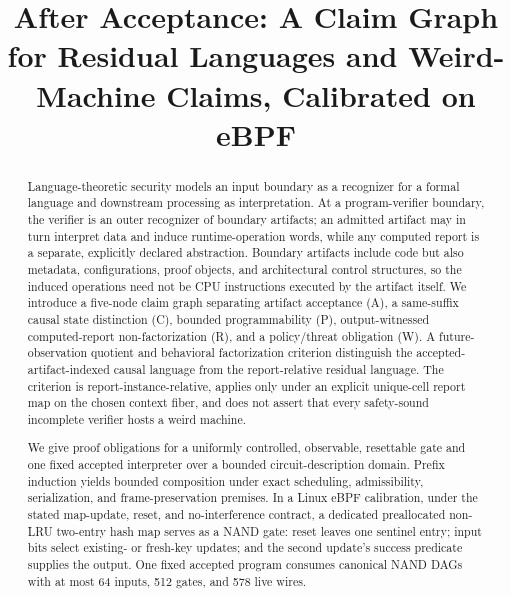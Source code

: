 \documentclass[conference]{IEEEtran}
\title{After Acceptance: A Claim Graph for Residual Languages and Weird-Machine Claims, Calibrated on eBPF}
\author{\IEEEauthorblockN{Chengao Zhang}
\IEEEauthorblockA{Independent Researcher\\emtanling@gmail.com}}
\begin{document}
\maketitle

\begin{abstract}
Language-theoretic security models an input boundary as a recognizer for a formal language and downstream processing as interpretation. At a program-verifier boundary, the verifier is an outer recognizer of boundary artifacts; an admitted artifact may in turn interpret data and induce runtime-operation words, while any computed report is a separate, explicitly declared abstraction. Boundary artifacts include code but also metadata, configurations, proof objects, and architectural control structures, so the induced operations need not be CPU instructions executed by the artifact itself. We introduce a five-node claim graph separating artifact acceptance (A), a same-suffix causal state distinction (C), bounded programmability (P), output-witnessed computed-report non-factorization (R), and a policy/threat obligation (W). A future-observation quotient and behavioral factorization criterion distinguish the accepted-artifact-indexed causal language from the report-relative residual language. The criterion is report-instance-relative, applies only under an explicit unique-cell report map on the chosen context fiber, and does not assert that every safety-sound incomplete verifier hosts a weird machine.

We give proof obligations for a uniformly controlled, observable, resettable gate and one fixed accepted interpreter over a bounded circuit-description domain. Prefix induction yields bounded composition under exact scheduling, admissibility, serialization, and frame-preservation premises. In a Linux eBPF calibration, under the stated map-update, reset, and no-interference contract, a dedicated preallocated non-LRU two-entry hash map serves as a NAND gate: reset leaves one sentinel entry; input bits select existing- or fresh-key updates; and the second update's success predicate supplies the output. One fixed accepted program consumes canonical NAND DAGs with at most 64 inputs, 512 gates, and 578 live wires.


\end{abstract}
\end{document}
